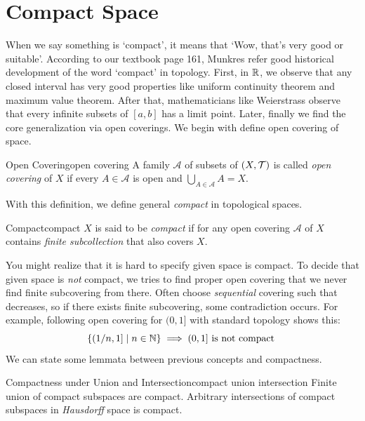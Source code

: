 \documentclass[12pt, a4paper, twoside]{article}
\newcommand{\CA}{{\mathcal {A}}} \newcommand{\CB}{{\mathcal {B}}}
\theoremstyle{plain}
\begin{document}
\newpage 

\section{Compact Space}

When we say something is \lq compact', it means that \lq Wow, that's very good or suitable'. According to our textbook page 161, Munkres\cite{munkres}
refer good historical development of the word \lq compact' in topology. 
First, in ${\mathbb {R}}$, we observe that any closed interval has very good properties like 
uniform continuity theorem and maximum value theorem. 
After that, mathematicians like Weierstrass observe that every infinite subsets of $[a, b]$ has a limit point. 
Later, finally we find the core generalization via open coverings. We begin with define open covering of space. 

\begin{defn}{Open Covering}{open covering}
    A family $\CA$ of subsets of $(X, {\mathcal {T}})$ is called \textit{open covering} of $X$ if 
    every $A \in \CA$ is open and $\bigcup_{A \in \CA} A = X$. 
\end{defn}

With this definition, we define general \textit{compact} in topological spaces. 

\begin{defn}{Compact}{compact}
    $X$ is said to be \textit{compact} if for any open covering $\CA$ of $X$ contains \textit{finite subcollection} that also covers $X$. 
\end{defn}

You might realize that it is hard to specify given space is compact. To decide that given space is \textit{not} compact, 
we tries to find proper open covering that we never find finite subcovering from there. Often 
choose \textit{sequential} covering such that decreases, so if there exists finite subcovering, 
some contradiction occurs. For example, following open covering for $(0,1]$ with standard topology shows this: 
\[\{\left(1/n, 1\right] \mid n \in {\mathbb {N}}\} \implies (0,1] \text{ is not compact }\]
We can state some lemmata between previous concepts and compactness. 

\begin{lem}{Compactness under Union and Intersection}{compact union intersection}
    Finite union of compact subspaces are compact. Arbitrary intersections of compact subspaces in \textit{Hausdorff} space is compact. 
\end{lem}
\end{document}
